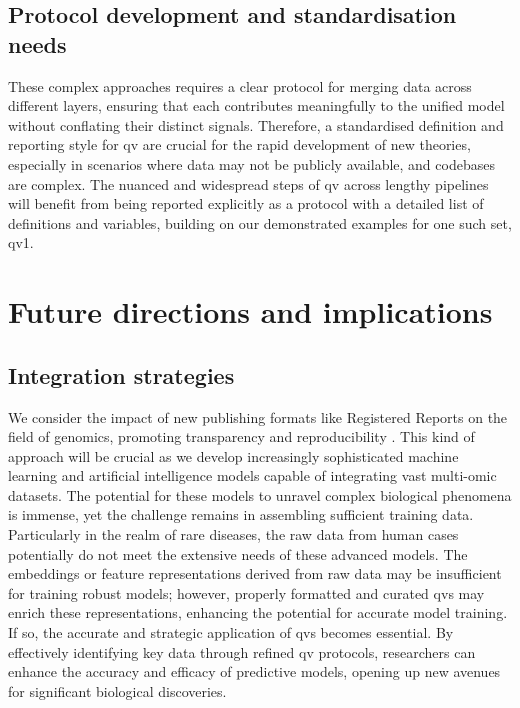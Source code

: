\subsection{Protocol development and standardisation needs} 

These complex approaches requires a clear protocol for merging data across different layers, ensuring that each contributes meaningfully to the unified model without conflating their distinct signals. 
Therefore, a standardised definition and reporting style for \ac{qv} are crucial for the rapid development of new theories, especially in scenarios where data may not be publicly available, and codebases are complex. 
The nuanced and widespread steps of \ac{qv} across lengthy pipelines will benefit from being reported explicitly as a protocol with a detailed list of definitions and variables, building on our demonstrated examples for one such set, \ac{qv}1.

\section{Future directions and implications} 
\subsection{Integration strategies}
We consider the impact of new publishing formats like Registered Reports on the field of genomics, promoting transparency and reproducibility 
\cite{chambers2014instead}. %
This kind of approach will be crucial as we develop increasingly sophisticated machine learning and artificial intelligence models capable of integrating vast multi-omic datasets. The potential for these models to unravel complex biological phenomena is immense, yet the challenge remains in assembling sufficient training data. Particularly in the realm of rare diseases, the raw data from human cases potentially do not meet the extensive needs of these advanced models. The embeddings or feature representations derived from raw data may be insufficient for training robust models; however, properly formatted and curated \ac{qv}s may enrich these representations, enhancing the potential for accurate model training. If so, the accurate and strategic application of \ac{qv}s becomes essential. By effectively identifying key data through refined \ac{qv} protocols, researchers can enhance the accuracy and efficacy of predictive models, opening up new avenues for significant biological discoveries.

